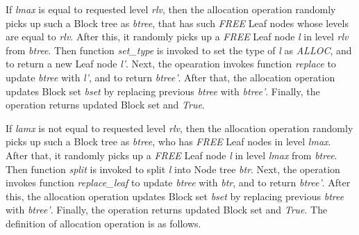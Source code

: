 If \emph{lmax} is equal to requested level \emph{rlv}, then the allocation operation randomly picks up such a Block tree as \emph{btree}, that has such \emph{FREE} Leaf nodes whose levels are equal to \emph{rlv}. After this, it randomly picks up a \emph{FREE} Leaf node \emph{l} in level \emph{rlv} from \emph{btree}. Then function \emph{set\_type} is invoked to set the type of \emph{l} as \emph{ALLOC}, and to return a new Leaf node \emph{l'}. Next, the opearation invokes function \emph{replace} to update \emph{btree} with \emph{l'}, and to return \emph{btree'}. After that, the allocation operation updates Block set \emph{bset} by replacing previous \emph{btree} with \emph{btree'}. Finally, the operation returns updated Block set and \emph{True}.

If \emph{lamx} is not equal to requested level \emph{rlv}, then the allocation operation randomly picks up such a Block tree as \emph{btree}, who has \emph{FREE} Leaf nodes in level \emph{lmax}. After that, it randomly picks up a \emph{FREE} Leaf node \emph{l} in level \emph{lmax} from \emph{btree}. Then function \emph{split} is invoked to split \emph{l} into Node tree \emph{btr}. Next, the operation invokes function \emph{replace\_leaf} to update \emph{btree} with \emph{btr}, and to return \emph{btree'}. After this, the allocation operation updates Block set \emph{bset} by replacing previous \emph{btree} with \emph{btree'}. Finally, the operation returns updated Block set and \emph{True}. The definition of allocation operation is as follows.

